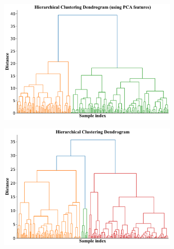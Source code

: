 \documentclass{article} %
\begin{document}
\begin{figure}[!t]
   \centering
   \begin{subfigure}{.49\textwidth}  %
       \centering
       \includegraphics[width=1.0\linewidth]{./figures/hierarchical_dendrogram.pdf}
       \vspace{-5pt}
       \label{fig:dendrogram1}
   \end{subfigure}
   \hfill %
   \begin{subfigure}{.49\textwidth}
       \centering
       \includegraphics[width=1.0\linewidth]{./figures/hierarchical_dendrogram_deep.pdf}

\end{subfigure}
\end{figure}
\end{document}
